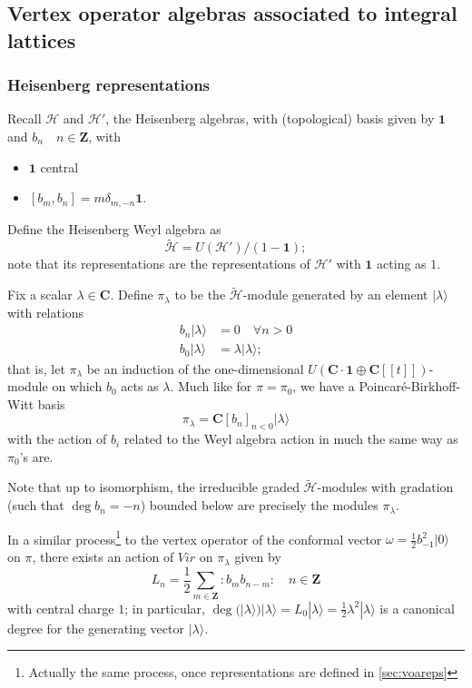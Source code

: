 \documentclass{article}
\newcommand{\CC}{\mathbold{C}}
\newcommand{\ZZ}{\mathbold{Z}}
\newcommand{\vac}{|0\rangle}
\newcommand{\Hh}{\mathcal{H}}
\newcommand{\one}{\mathbold{1}}
\begin{document}
\subsection{Vertex operator algebras associated to integral lattices}

\subsubsection{Heisenberg representations}

Recall $\Hh$ and $\Hh'$, the Heisenberg algebras, with (topological) basis given by $\one$ and $b_n \quad n \in \ZZ$, with
\begin{itemize}
\item $\one$ central
\item $[b_m,b_n]=m\delta_{m,-n}\one$.
\end{itemize}
Define the Heisenberg Weyl algebra as
\[\widetilde{\Hh}=U(\Hh')/(1-\one); \]
note that its representations are the representations of $\Hh'$ with $\one$ acting as $1$.

Fix a scalar $\lambda \in \CC$.  Define $\pi_\lambda$ to be the $\widetilde{\Hh}$-module generated by an element $|\lambda\rangle$ with relations
\begin{align*}
  b_n|\lambda\rangle&=0 \quad \forall n>0\\
  b_0|\lambda\rangle&=\lambda|\lambda\rangle;
\end{align*}
that is, let $\pi_\lambda$ be an induction of the one-dimensional $U(\CC \cdot \one \oplus \CC[[t]])$-module on which $b_0$ acts as $\lambda$.  Much like for $\pi=\pi_0$, we have a Poincaré-Birkhoff-Witt basis
\[\pi_\lambda=\CC[b_n]_{n<0}|\lambda\rangle \]
with the action of $b_i$ related to the Weyl algebra action in much the same way as $\pi_0$'s are.

Note that up to isomorphism, the irreducible graded $\widetilde{\Hh}$-modules with gradation (such that $\deg b_n=-n$) bounded below are precisely the modules $\pi_\lambda$.

In a similar process\footnote{Actually the same process, once representations are defined in \ref{sec:voareps}} to the vertex operator of the conformal vector $\omega=\frac{1}{2}b_{-1}^2\vac$ on $\pi$, there exists an action of $Vir$ on $\pi_\lambda$ given by
\[L_n = \frac{1}{2}\sum_{m \in \ZZ}:b_mb_{n-m}: \quad n \in \ZZ \]
with central charge $1$; in particular, $\deg(|\lambda\rangle)|\lambda\rangle=L_0|\lambda\rangle=\frac{1}{2}\lambda^2|\lambda\rangle$ is a canonical degree for the generating vector $|\lambda\rangle$.
\end{document}
